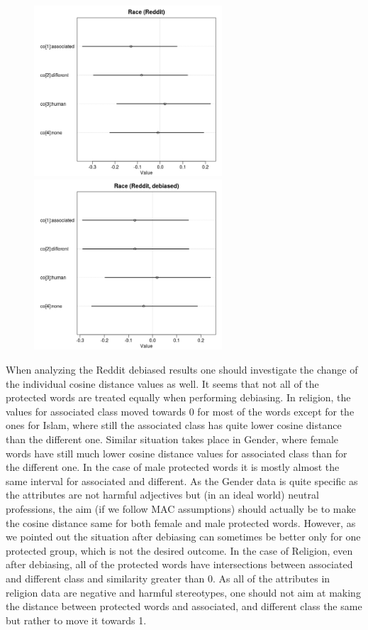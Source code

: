 \documentclass[
  10pt,
  dvipsnames,enabledeprecatedfontcommands]{scrartcl}
\begin{document}
\begin{center}
\begin{figure}[!htb]
   
  \begin{minipage}{0.55\textwidth}
\includegraphics[width=7cm]{../images/raceCoeffs.jpeg}
\end{minipage}
   \begin {minipage}{0.43\textwidth}
    \includegraphics[width=7cm]{../images/debiasedRaceRedditCoeffs.jpeg}
   \end{minipage}
\end{figure}

\end{center}

When analyzing the Reddit debiased results one should investigate the
change of the individual cosine distance values as well. It seems that
not all of the protected words are treated equally when performing
debiasing. In religion, the values for associated class moved towards 0
for most of the words except for the ones for Islam, where still the
associated class has quite lower cosine distance than the different one.
Similar situation takes place in Gender, where female words have still
much lower cosine distance values for associated class than for the
different one. In the case of male protected words it is mostly almost
the same interval for associated and different. As the Gender data is
quite specific as the attributes are not harmful adjectives but (in an
ideal world) neutral professions, the aim (if we follow MAC assumptions)
should actually be to make the cosine distance same for both female and
male protected words. However, as we pointed out the situation after
debiasing can sometimes be better only for one protected group, which is
not the desired outcome. In the case of Religion, even after debiasing,
all of the protected words have intersections between associated and
different class and similarity greater than 0. As all of the attributes
in religion data are negative and harmful stereotypes, one should not
aim at making the distance between protected words and associated, and
different class the same but rather to move it towards 1.
\end{document}

